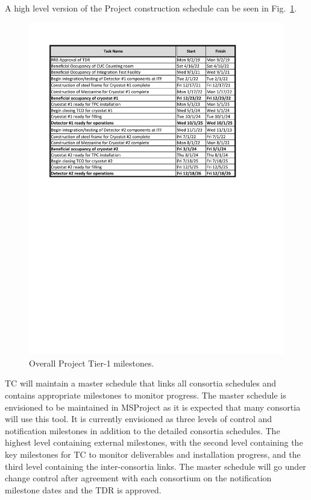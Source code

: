 A high level version of the  Project construction schedule
can be seen in Fig.~\ref{fig:DUNE_schedule}.
\begin{figure}[htb]
  \begin{center}
    \includegraphics[width=\textwidth]{far-detector-generic/figures/FD_Cnst_Schedule}
    \caption{Overall  Project Tier-1 milestones.}
    \label{fig:DUNE_schedule}
  \end{center}
\end{figure}
TC will maintain a master schedule that links all consortia schedules
and contains appropriate milestones to monitor progress. The master
schedule is envisioned to be maintained in MSProject as it is expected
that many consortia will use this tool. It is currently envisioned as
three levels of control and notification milestones in addition to the
detailed consortia schedules. The highest level containing external
milestones, with the second level containing the key milestones for TC
to monitor deliverables and installation progress, and the third level
containing the inter-consortia links. The master schedule will go
under change control after agreement with each consortium on the
notification milestone dates and the TDR is approved.


